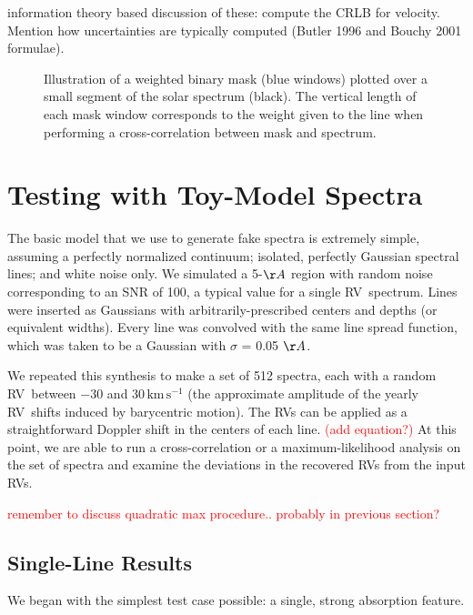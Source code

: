 \documentclass[modern]{aastex61}
\newcommand{\unit}[1]{\mathrm{#1}}
\newcommand{\km}{\unit{km}}
\newcommand{\s}{\unit{s}}
\newcommand{\kms}{\km\,\s^{-1}}
\newcommand\todo[1]{\textcolor{red}{#1}}  %
\newcommand{\acronym}[1]{{\small{#1}}}
\newcommand{\RV}{\acronym{RV}}
\begin{document}
information theory based discussion of these: compute the CRLB for velocity. Mention how uncertainties are typically computed (Butler 1996 and Bouchy 2001 formulae).

\begin{figure}
\centering
\caption{Illustration of a weighted binary mask (blue windows) plotted over a small segment of the solar spectrum (black). The vertical length of each mask window corresponds to the weight given to the line when performing a cross-correlation between mask and spectrum.}
\label{fig:binarymask}
\end{figure}


\section{Testing with Toy-Model Spectra}


The basic model that we use to generate fake spectra is extremely simple, assuming a perfectly normalized continuum; isolated, perfectly Gaussian spectral lines; and white noise only. We simulated a 5-$\AA$ region with random noise corresponding to an SNR of 100, a typical value for a single \RV\ spectrum. Lines were inserted as Gaussians with arbitrarily-prescribed centers and depths (or equivalent widths). Every line was convolved with the same line spread function, which was taken to be a Gaussian with $\sigma$ = 0.05 $\AA$. %

We repeated this synthesis to make a set of 512 spectra, each with a random \RV\ between $-30$ and $30\,\kms$ (the approximate amplitude of the yearly \RV\ shifts induced by barycentric motion). The \RV s can be applied as a straightforward Doppler shift in the centers of each line. \todo{(add equation?)} At this point, we are able to run a cross-correlation or a maximum-likelihood analysis on the set of spectra and examine the deviations in the recovered \RV s from the input \RV s.

\todo{remember to discuss quadratic max procedure.. probably in previous section?}

\subsection{Single-Line Results}

We began with the simplest test case possible: a single, strong absorption feature.
\end{document}
